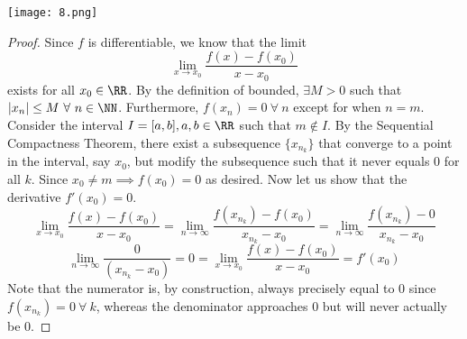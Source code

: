 \documentclass[12pt]{scrartcl}
\begin{document}
\newpage 

\texttt{[image: 8.png]}

\begin{proof}
  
\hfill

Since $f$ is differentiable, we know that the limit 
\[\lim_{x\to x_0} \frac{f(x) - f(x_0)}{x - x_0}\]
exists for all $x_0 \in \RR$. By the definition of bounded, $\exists M > 0$ such that 
$|x_n| \leq M \ \forall \ n \in \NN$. Furthermore, $f(x_n) = 0 \ \forall \ n$ except for 
when $n = m$. Consider the interval $I = [a, b], a, b \in \RR$ such that $m \notin I$. By the Sequential Compactness Theorem, there exist a subsequence $\{x_{n_k}\}$  that converge to a point in the interval, say $x_0$, but 
modify the subsequence such that it never equals $0$ for all $k$. 
Since $x_0 \neq m \implies f(x_0) = 0$ as desired. 
Now let us show that the derivative $f'(x_0) = 0$.
\[\lim_{x\to x_0}\frac{f(x) - f(x_0)}{x - x_0} = \lim_{n\to\infty}\frac{f(x_{n_k}) - f(x_0)}{x_{n_k} - x_0} = \lim_{n\to\infty}\frac{f(x_{n_k}) - 0}{x_{n_k} - x_0}\]
\[\lim_{n\to\infty} \frac{0}{(x_{n_k} - x_0)} = 0 = \lim_{x\to x_0} \frac{f(x) - f(x_0)}{x - x_0} = f'(x_0)\]
Note that the numerator is, by construction, always precisely equal to $0$ since $f(x_{n_k}) = 0 \ \forall \ k$, 
whereas the denominator approaches $0$ but will never actually be $0$.

\end{proof}
\end{document}
